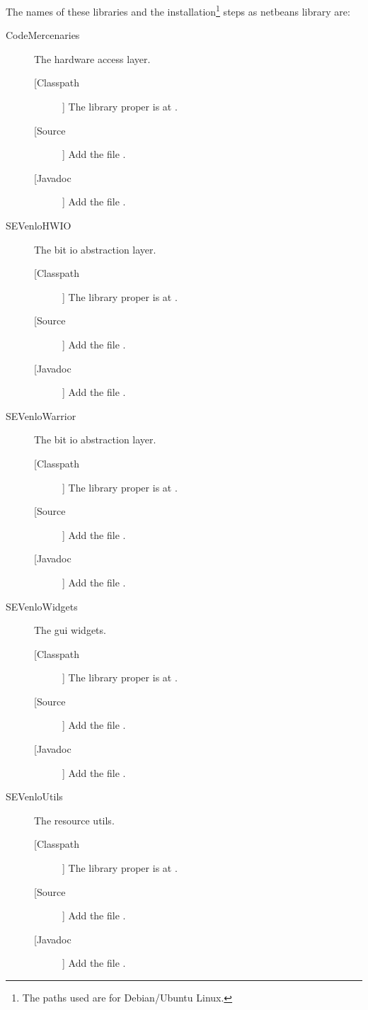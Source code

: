 The names of these libraries and the installation\footnote{The paths
  used are for Debian/Ubuntu Linux.} steps as netbeans library are:
{
\setlength\parsep{0pt}
\setlength\topsep{0pt}
\setlength\partopsep{0pt}
\setlength\parskip{0pt}
\setlength\itemsep{0pt}
\newcommand\Classpath{[Classpath]}
\newcommand\Sources{[Source]}
\newcommand\Javadoc{[Javadoc]}
\begin{description}
\item[CodeMercenaries] The hardware access layer.
  \begin{description}
  \item[\Classpath] The library proper is at .
  \item[\Sources] Add the file .
  \item[\Javadoc] Add the file .
  \end{description}
\item[SEVenloHWIO] The bit io abstraction layer. 
  \begin{description}
  \item[\Classpath] The library proper is at .
  \item[\Sources] Add the file .
  \item[\Javadoc] Add the file .
  \end{description}
\item[SEVenloWarrior] The bit io abstraction layer. 
  \begin{description}
  \item[\Classpath] The library proper is at .
  \item[\Sources] Add the file .
  \item[\Javadoc] Add the file .
  \end{description}
\item[SEVenloWidgets] The gui widgets. 
  \begin{description}
  \item[\Classpath] The library proper is at .
  \item[\Sources] Add the file .
  \item[\Javadoc] Add the file .
  \end{description}
\item[SEVenloUtils] The resource utils. 
  \begin{description}
  \item[\Classpath] The library proper is at .
  \item[\Sources] Add the file .
  \item[\Javadoc] Add the file .
  \end{description}
\end{description}
} %

